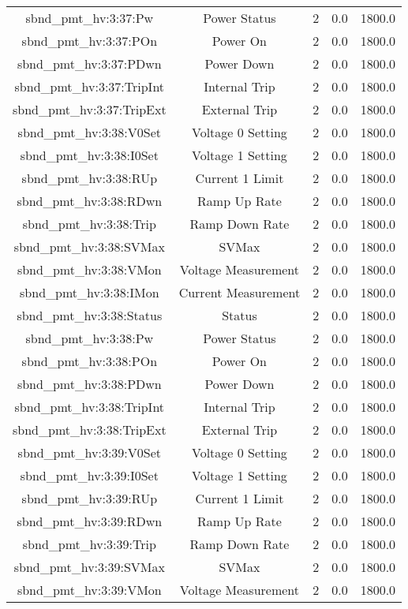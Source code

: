 \begin{table}[ptb]
\begin{tabular}{c | c c c c}
sbnd_pmt_hv:3:37:Pw & Power Status & 2 & 0.0 & 1800.0\\ 
sbnd_pmt_hv:3:37:POn & Power On & 2 & 0.0 & 1800.0\\ 
sbnd_pmt_hv:3:37:PDwn & Power Down & 2 & 0.0 & 1800.0\\ 
sbnd_pmt_hv:3:37:TripInt & Internal Trip & 2 & 0.0 & 1800.0\\ 
sbnd_pmt_hv:3:37:TripExt & External Trip & 2 & 0.0 & 1800.0\\ 
sbnd_pmt_hv:3:38:V0Set & Voltage 0 Setting & 2 & 0.0 & 1800.0\\ 
sbnd_pmt_hv:3:38:I0Set & Voltage 1 Setting & 2 & 0.0 & 1800.0\\ 
sbnd_pmt_hv:3:38:RUp & Current 1 Limit & 2 & 0.0 & 1800.0\\ 
sbnd_pmt_hv:3:38:RDwn & Ramp Up Rate & 2 & 0.0 & 1800.0\\ 
sbnd_pmt_hv:3:38:Trip & Ramp Down Rate & 2 & 0.0 & 1800.0\\ 
sbnd_pmt_hv:3:38:SVMax & SVMax & 2 & 0.0 & 1800.0\\ 
sbnd_pmt_hv:3:38:VMon & Voltage Measurement & 2 & 0.0 & 1800.0\\ 
sbnd_pmt_hv:3:38:IMon & Current Measurement & 2 & 0.0 & 1800.0\\ 
sbnd_pmt_hv:3:38:Status & Status & 2 & 0.0 & 1800.0\\ 
sbnd_pmt_hv:3:38:Pw & Power Status & 2 & 0.0 & 1800.0\\ 
sbnd_pmt_hv:3:38:POn & Power On & 2 & 0.0 & 1800.0\\ 
sbnd_pmt_hv:3:38:PDwn & Power Down & 2 & 0.0 & 1800.0\\ 
sbnd_pmt_hv:3:38:TripInt & Internal Trip & 2 & 0.0 & 1800.0\\ 
sbnd_pmt_hv:3:38:TripExt & External Trip & 2 & 0.0 & 1800.0\\ 
sbnd_pmt_hv:3:39:V0Set & Voltage 0 Setting & 2 & 0.0 & 1800.0\\ 
sbnd_pmt_hv:3:39:I0Set & Voltage 1 Setting & 2 & 0.0 & 1800.0\\ 
sbnd_pmt_hv:3:39:RUp & Current 1 Limit & 2 & 0.0 & 1800.0\\ 
sbnd_pmt_hv:3:39:RDwn & Ramp Up Rate & 2 & 0.0 & 1800.0\\ 
sbnd_pmt_hv:3:39:Trip & Ramp Down Rate & 2 & 0.0 & 1800.0\\ 
sbnd_pmt_hv:3:39:SVMax & SVMax & 2 & 0.0 & 1800.0\\ 
sbnd_pmt_hv:3:39:VMon & Voltage Measurement & 2 & 0.0 & 1800.0\\ 

\end{tabular}
\end{table}

